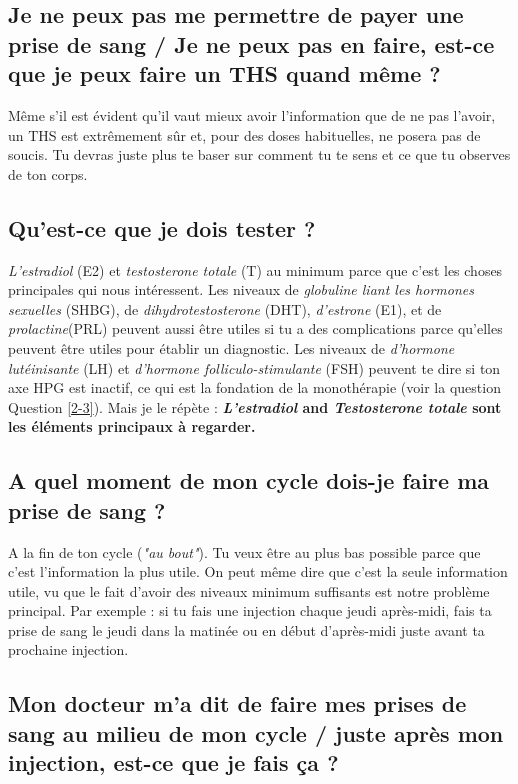 \documentclass{article}
\begin{document}
\subsection{Je ne peux pas me permettre de payer une prise de sang / Je ne peux pas en faire, est-ce que je peux faire un THS quand même ?}

Même s'il est évident qu'il vaut mieux avoir l'information que de ne pas l'avoir, un THS est extrêmement sûr et, pour des doses habituelles, ne posera pas de soucis. Tu devras juste plus te baser sur comment tu te sens et ce que tu observes de ton corps.

\subsection{Qu'est-ce que je dois tester ?}

\textit{L'estradiol} (E2) et \textit{testosterone totale} (T) au minimum parce que c'est les choses principales qui nous intéressent. Les niveaux de \textit{globuline liant les hormones sexuelles} (SHBG), de \textit{dihydrotestosterone} (DHT), \textit{d'estrone} (E1), et de \textit{prolactine}(PRL) peuvent aussi être utiles si tu a des complications parce qu'elles peuvent être utiles pour établir un diagnostic. Les niveaux de \textit{d'hormone lutéinisante} (LH) et \textit{d'hormone folliculo-stimulante} (FSH) peuvent te dire si ton axe HPG est inactif, ce qui est la fondation de la monothérapie (voir la question Question \ref{2-3}). Mais je le répète : \textbf{\textit{L'estradiol} and \textit{Testosterone totale} sont les éléments principaux à regarder.} 

\subsection{A quel moment de mon cycle dois-je faire ma prise de sang ?}

A la fin de ton cycle (\textit{"au bout"}). Tu veux être au plus bas possible parce que c'est l'information la plus utile. On peut même dire que c'est la seule information utile, vu que le fait d'avoir des niveaux minimum suffisants est notre problème principal. Par exemple : si tu fais une injection chaque jeudi après-midi, fais ta prise de sang le jeudi dans la matinée ou en début d'après-midi juste avant ta prochaine injection.

\subsection{Mon docteur m'a dit de faire mes prises de sang au milieu de mon cycle / juste après mon injection, est-ce que je fais ça ?}
\end{document}
